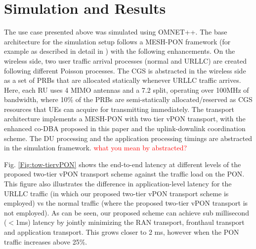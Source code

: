 \documentclass[a4paper, oneside, twocolumn, notitlepage, 10pt]{extarticle_ecoc}
\begin{document}
	 

    
\section{Simulation and Results} \label{sec:Results}
The use case presented above was simulated using OMNET++. The base architecture for the simulation setup follows a MESH-PON framework (for example as described in detail in \cite{MESH-Networks}) with the following enhancements. On the wireless side, two user traffic arrival processes (normal and URLLC) are created following different Poisson processes. The \ac{CGS} is abstracted in the wireless side as a set of PRBs that are allocated statically whenever URLLC traffic arrives. Here, each RU uses 4 MIMO antennas and a 7.2 split, operating over 100MHz of bandwidth, where 10\% of the PRBs are semi-statically allocated/reserved as CGS resources that UEs can acquire for transmitting immediately. The transport architecture implements a MESH-PON with two tier vPON transport, with the enhanced co-DBA proposed in this paper and the uplink-downlink coordination scheme. The DU processing and the application processing timings are abstracted in the simulation framework. \textcolor{red}{what you mean by abstracted?}

Fig. \ref{Fig:tow-tiervPON} shows the end-to-end latency at different levels of the proposed two-tier vPON transport scheme against the traffic load on the PON. This figure also illustrates the difference in application-level latency for the URLLC traffic (in which our proposed two-tier vPON transport scheme is employed) vs the normal traffic (where the proposed two-tier vPON transport is not employed). As can be seen, our proposed scheme can achieve sub millisecond ($<$1ms) latency by jointly minimizing the RAN transport, fronthaul transport and application transport. This grows closer to 2 ms, however when the PON traffic increases above 25\%.
\end{document}

